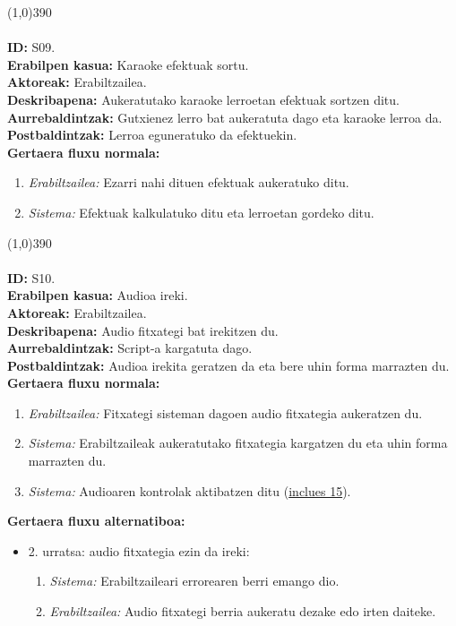 \line(1,0){390}\\
\noindent\\
\textbf{ID:} S09.\\
\textbf{Erabilpen kasua:} Karaoke efektuak sortu.\\
\textbf{Aktoreak:} Erabiltzailea.\\
\textbf{Deskribapena:} Aukeratutako karaoke lerroetan efektuak sortzen ditu.\\
\textbf{Aurrebaldintzak:} Gutxienez lerro bat aukeratuta dago eta karaoke lerroa da.\\
\textbf{Postbaldintzak:} Lerroa eguneratuko da efektuekin.\\
\textbf{Gertaera fluxu normala:}
\begin{enumerate}
	\item \textit{Erabiltzailea:} Ezarri nahi dituen efektuak aukeratuko ditu.
	\item \textit{Sistema:} Efektuak kalkulatuko ditu eta lerroetan gordeko ditu.
\end{enumerate}
\line(1,0){390}\\
\noindent\\
\textbf{ID:} S10.\\
\textbf{Erabilpen kasua:} Audioa ireki.\\
\textbf{Aktoreak:} Erabiltzailea.\\
\textbf{Deskribapena:} Audio fitxategi bat irekitzen du.\\
\textbf{Aurrebaldintzak:} Script-a kargatuta dago.\\
\textbf{Postbaldintzak:} Audioa irekita geratzen da eta bere uhin forma marrazten du.\\
\textbf{Gertaera fluxu normala:}
\begin{enumerate}
	\item \textit{Erabiltzailea:} Fitxategi sisteman dagoen audio fitxategia aukeratzen du.
	\item \textit{Sistema:} Erabiltzaileak aukeratutako fitxategia kargatzen du eta uhin forma marrazten du.
	\item \textit{Sistema:} Audioaren kontrolak aktibatzen ditu (\underline{inclues 15}).
\end{enumerate}
\textbf{Gertaera fluxu alternatiboa:}
\begin{itemize}
	\item 2. urratsa: audio fitxategia ezin da ireki:
		\begin{enumerate}
		\item \textit{Sistema:} Erabiltzaileari errorearen berri emango dio.
		\item \textit{Erabiltzailea:} Audio fitxategi berria aukeratu dezake edo irten daiteke.
		\end{enumerate}
\end{itemize}
